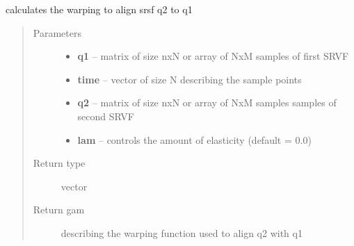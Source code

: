 \documentclass[letterpaper,10pt,english]{sphinxmanual}
\begin{document}

\begin{fulllineitems}
\label{curve_functions:curve_functions.optimum_reparam_curve}
calculates the warping to align srsf q2 to q1
\begin{quote}\begin{description}
\item[{Parameters}] \leavevmode\begin{itemize}
\item {} 
\textbf{q1} -- matrix of size nxN or array of NxM samples of first SRVF

\item {} 
\textbf{time} -- vector of size N describing the sample points

\item {} 
\textbf{q2} -- matrix of size nxN or array of NxM samples samples of second SRVF

\item {} 
\textbf{lam} -- controls the amount of elasticity (default = 0.0)

\end{itemize}

\item[{Return type}] \leavevmode
vector

\item[{Return gam}] \leavevmode
describing the warping function used to align q2 with q1

\end{description}\end{quote}

\end{fulllineitems}

\end{document}
